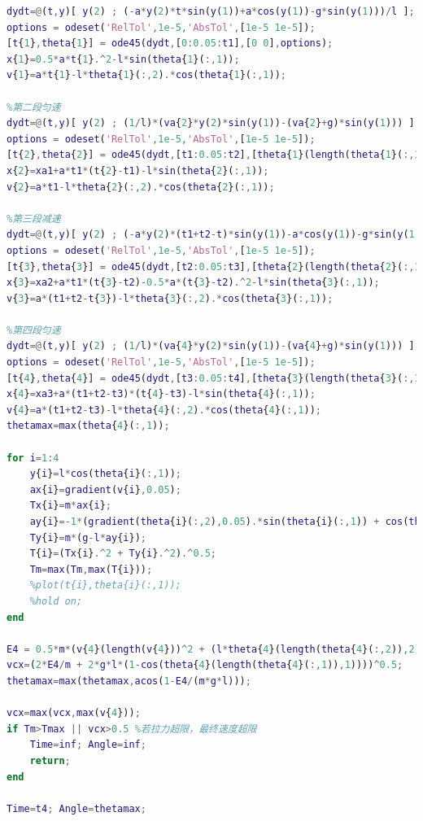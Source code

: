 \documentclass[withoutpreface,bwprint]{cumcmthesis} %
\begin{document}
\begin{appendices}
\begin{lstlisting}[language=matlab]
%第一段加速
dydt=@(t,y)[ y(2) ; (-a*y(2)*t*sin(y(1))+a*cos(y(1))-g*sin(y(1)))/l ];
options = odeset('RelTol',1e-5,'AbsTol',[1e-5 1e-5]);
[t{1},theta{1}] = ode45(dydt,[0:0.05:t1],[0 0],options);
x{1}=0.5*a*t{1}.^2-l*sin(theta{1}(:,1));
v{1}=a*t{1}-l*theta{1}(:,2).*cos(theta{1}(:,1));

%第二段匀速
dydt=@(t,y)[ y(2) ; (1/l)*(va{2}*y(2)*sin(y(1))-(va{2}+g)*sin(y(1))) ];
options = odeset('RelTol',1e-5,'AbsTol',[1e-5 1e-5]);
[t{2},theta{2}] = ode45(dydt,[t1:0.05:t2],[theta{1}(length(theta{1}(:,1)),1) theta{1}(length(theta{1}(:,2)),2)],options);
x{2}=xa1+a*t1*(t{2}-t1)-l*sin(theta{2}(:,1));
v{2}=a*t1-l*theta{2}(:,2).*cos(theta{2}(:,1));

%第三段减速
dydt=@(t,y)[ y(2) ; (-a*y(2)*(t1+t2-t)*sin(y(1))-a*cos(y(1))-g*sin(y(1)))/l ];
options = odeset('RelTol',1e-5,'AbsTol',[1e-5 1e-5]);
[t{3},theta{3}] = ode45(dydt,[t2:0.05:t3],[theta{2}(length(theta{2}(:,1)),1) theta{2}(length(theta{2}(:,2)),2)],options);
x{3}=xa2+a*t1*(t{3}-t2)-0.5*a*(t{3}-t2).^2-l*sin(theta{3}(:,1));
v{3}=a*(t1+t2-t{3})-l*theta{3}(:,2).*cos(theta{3}(:,1));

%第四段匀速
dydt=@(t,y)[ y(2) ; (1/l)*(va{4}*y(2)*sin(y(1))-(va{4}+g)*sin(y(1))) ];
options = odeset('RelTol',1e-5,'AbsTol',[1e-5 1e-5]);
[t{4},theta{4}] = ode45(dydt,[t3:0.05:t4],[theta{3}(length(theta{3}(:,1)),1) theta{3}(length(theta{3}(:,2)),2)],options);
x{4}=xa3+a*(t1+t2-t3)*(t{4}-t3)-l*sin(theta{4}(:,1));
v{4}=a*(t1+t2-t3)-l*theta{4}(:,2).*cos(theta{4}(:,1));
thetamax=max(theta{4}(:,1));

for i=1:4
    y{i}=l*cos(theta{i}(:,1));
    ax{i}=gradient(v{i},0.05);
    Tx{i}=m*ax{i};
    ay{i}=-1*(gradient(theta{i}(:,2),0.05).*sin(theta{i}(:,1)) + cos(theta{i}(:,1)).*theta{i}(:,2).^2);
    Ty{i}=m*(g-l*ay{i});
    T{i}=(Tx{i}.^2 + Ty{i}.^2).^0.5;
    Tm=max(Tm,max(T{i}));
    %plot(t{i},theta{i}(:,1));
    %hold on;
end

E4 = 0.5*m*(v{4}(length(v{4}))^2 + (l*theta{4}(length(theta{4}(:,2)),2)*sin(theta{4}(length(theta{4}(:,1)),1)))^2);
vcx=(2*E4/m + 2*g*l*(1-cos(theta{4}(length(theta{4}(:,1)),1))))^0.5;
thetamax=max(thetamax,acos(1-E4/(m*g*l)));

vcx=max(vcx,max(v{4}));
if Tm>Tmax || vcx>0.5 %若拉力超限，最终速度超限
    Time=inf; Angle=inf;
    return;
end

Time=t4; Angle=thetamax;
     \end{lstlisting}

\end{appendices}
\end{document}
